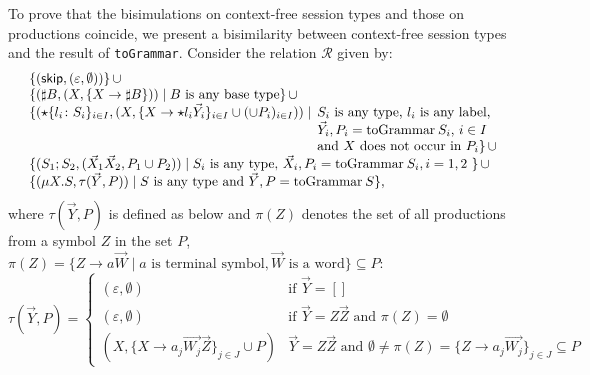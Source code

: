 To prove that the bisimulations on context-free session types and
those on productions coincide, we present a bisimilarity between
context-free session types and the result of \lstinline|toGrammar|.
%
%
Consider the relation $\mathcal{R}$ given by:
\[\begin{array}{lll}
	& \{ (\skipk, (\varepsilon, \emptyset))\} \,\cup\\
	& \{(\sharp B,(X,\{X \rightarrow \sharp B\})) \mid \text{$B$ is any base type}\} 
	   \,\cup\\
	& \{ (\star\{l_i\colon S_i\}_{i\in I}, (X, \{X \rightarrow \star l_i
    \vec Y_i\}_{i\in I} \cup (\cup  P_i)_{i\in I})) \mid 
    \begin{array}[t]{l}
    	\!\!\text{$S_i$ is any type, $l_i$ is any label,}\\
    	\!\!\text{$\vec Y_i, P_i = \toGrammarf{S_i}$, $i \in I$ }\\
    	\!\!\text{and $X$ does not occur in $P_i$}\} \,\cup\\
    \end{array}\\
    &\{(S_1;S_2, (\vec X_1\vec X_2,  P_1 \cup  P_2)) \mid
    \text{$S_i$ is any type, $\vec X_i, P_i = \toGrammarf{S_i}, i = 1,2$ } \}\,\cup\\
	& \{(\mu X.S, \tau(\vec Y, P))\mid
    \text{$S$ is any type and $\vec Y, P = \toGrammarf{S}$}\},\\
\end{array}\]
where $\tau(\vec Y, P)$ is defined as below and $\pi (Z)$
denotes the set of all productions from a symbol $Z$ in the set $P$, 
$\pi (Z) = \{Z \rightarrow a \vec {W}\mid a \text{ is terminal
symbol}, \vec W \text{ is a word}\}\subseteq P$:
\[
\tau (\vec Y, P ) = 
\begin{cases}
	(\varepsilon, \emptyset) & \text{if } \vec Y =[]\\
	(\varepsilon, \emptyset) & \text{if } \vec Y = Z\vec Z \text{ and } \pi(Z) = \emptyset \\	
	(X, \{X \rightarrow a_j \vec {W_j}\vec Z\}_{j\in J} \cup  P) &
	\vec Y = Z\vec Z \text{ and } \emptyset \neq \pi(Z) = 
	\{Z \rightarrow a_j \vec {W_j}\}_{j\in J}\subseteq P
\end{cases}
\]

